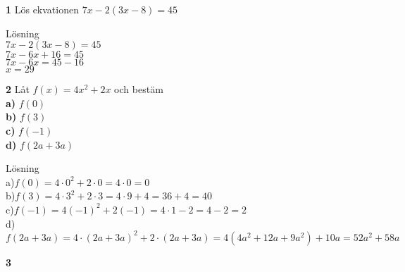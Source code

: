 \documentclass{article}
\begin{document}
\textbf{1} Lös ekvationen $7x-2(3x-8)=45$

Lösning\\
$7x-2(3x-8)=45$\\
$7x-6x+16=45$\\
$7x-6x=45-16$\\
$x=29$

\textbf{2} Låt $f(x)=4x^{2}+2x$ och bestäm\\
\textbf{a)} $f(0)$\\
\textbf{b)} $f(3)$\\
\textbf{c)} $f(-1)$\\
\textbf{d)} $f(2a + 3a)$

Lösning\\
a)$f(0)=4\cdot0^2+2\cdot0=4\cdot0=0$\\
b)$f(3)=4\cdot3^2+2\cdot3=4\cdot9+4=36+4=40$\\
c)$f(-1)=4(-1)^2+2(-1)=4\cdot1-2=4-2=2$\\
d)$f(2a+3a)=4\cdot(2a+3a)^2+2\cdot(2a+3a)=4(4a^2+12a+9a^2)+10a=52a^2+58a$

\textbf{3}
\end{document}
